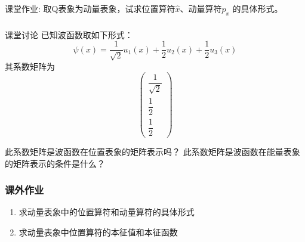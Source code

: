 \begin{frame} 
    \frametitle{}
    \begin{exampleblock}{课堂作业:}
    取Q表象为动量表象，试求位置算符$\hat{x}$、动量算符$\hat{p}_x$ 的具体形式。
    \end{exampleblock}
\end{frame} 

\begin{frame} 
    \frametitle{}
    \begin{tcolorbox2}{课堂讨论}
    已知波函数取如下形式：$$\psi(x)=\dfrac{1}{\sqrt{2}}u_1(x)+\dfrac{1}{2}u_2(x)+\dfrac{1}{2}u_3(x)$$
    其系数矩阵为$$\begin{pmatrix}
            \dfrac{1}{\sqrt{2}}\\
            \dfrac{1}{2}\\
            \dfrac{1}{2}
            \end{pmatrix}$$
    \begin{enumerate}
        \Item  此系数矩阵是波函数在位置表象的矩阵表示吗？
        \Item  此系数矩阵是波函数在能量表象的矩阵表示的条件是什么？  
    \end{enumerate}
    \end{tcolorbox2}
\end{frame} 

\begin{frame}
    \frametitle{课外作业}
    \begin{enumerate}
        \item 求动量表象中的位置算符和动量算符的具体形式
        \item 求动量表象中位置算符的本征值和本征函数
    \end{enumerate}
\end{frame}
